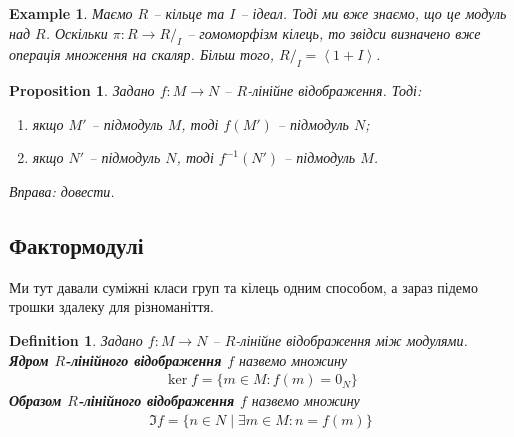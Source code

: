 \documentclass[a4paper, 10pt]{article}
\makeatletter
\theoremstyle{theoremdd}
\theoremstyle{theoremdd}
\newtheorem{definition}[theorem]{Definition}
\theoremstyle{theoremdd}
\theoremstyle{theoremdd}
\theoremstyle{theoremdd}
\newtheorem{example}[theorem]{Example}
\theoremstyle{theoremdd}
\theoremstyle{theoremdd}
\theoremstyle{theoremdd}
\theoremstyle{theoremdd}
\newtheorem{proposition}[theorem]{Proposition}
\theoremstyle{theoremdd}
\theoremstyle{theoremdd}
\theoremstyle{theoremdd}
\theoremstyle{theoremdd}
\theoremstyle{theoremdd}
\theoremstyle{theoremdd}
\renewenvironment{proof}[1][Proof.\\]{\par
\pushQED{\hfill \qed}%
\normalfont \topsep6\p@\@plus6\p@\relax
\trivlist
\item\relax
{\bfseries
#1\@addpunct{.}}\hspace\labelsep\ignorespaces
}{%
\popQED\endtrivlist\@endpefalse
}
\makeatother
\begin{document}
\begin{example}
Маємо $R$ -- кільце та $I$ -- ідеал. Тоді ми вже знаємо, що це модуль над $R$. Оскільки $\pi \colon R \to R/_I$ -- гомоморфізм кілець, то звідси визначено вже операція множення на скаляр. Більш того, $R/_I = \left< 1 + I\right>$.
\end{example}

\begin{proposition}
Задано $f \colon M \to N$ -- $R$-лінійне відображення. Тоді:
\begin{enumerate}[nosep, wide=0pt, label={\arabic*)}]
\item якщо $M'$ -- підмодуль $M$, тоді $f(M')$ -- підмодуль $N$;
\item якщо $N'$ -- підмодуль $N$, тоді $f^{-1}(N')$ -- підмодуль $M$.
\end{enumerate}
\textit{Вправа: довести.}
\end{proposition}

\iffalse
\begin{proof}
Треба довести, що виконується замкненість відносно додавання та множення на скаялр.\\
1) $n_1,n_2 \in f(M')$, тобто існують $m_1,m_2 \in M'$, для яких $m_1 = f(n_1),\ m_2 = f(n_2)$. Оскільки $m_1,m_2 \in M'$, то за умовою, $m_1 + m_2 \in M'$, а тому звідси $n_1 + n_2 = f(m_1) + f(m_2) = f(m_1+m_2) \implies n_1 + n_2 \in f(M')$.\\
$n \in f(M'),\ r \in R$, тобто $n = f(m)$ для деякого $m \in M'$. Аналогічно за умовою, $rm \in M'$, а тому $rn = r f(m) = f(rm) \implies rn \in f(M')$.
\bigskip \\
2) $m_1,m_2 \in f^{-1}(N')$, тобто $f(m_1),f(m_2) \in N'$. Тоді звідси, за умовою, $f(m_1) + f(m_2) = f(m_1+m_2) \in N' \implies m_1+m_2 \in f^{-1}(N')$.\\
$m \in f^{-1}(N),\ r \in R$, тому $f(m) \in N'$. За умовою, $r f(m) \in N'$, але тоді $rm \in f^{-1}(N')$.
\end{proof}
\fi

\subsection{Фактормодулі}
Ми тут давали суміжні класи груп та кілець одним способом, а зараз підемо трошки здалеку для різноманіття.

\begin{definition}
Задано $f \colon M \to N$ -- $R$-лінійне відображення між модулями.\\
\textbf{Ядром $R$-лінійного відображення $f$} назвемо множину
\begin{align*}
\ker f = \{ m \in M: f(m) = 0_N \}
\end{align*}
\textbf{Образом $R$-лінійного відображення $f$} назвемо множину
\begin{align*}
\Im f = \{ n \in N \mid \exists m \in M: n = f(m) \}
\end{align*}
\end{definition}
\end{document}
